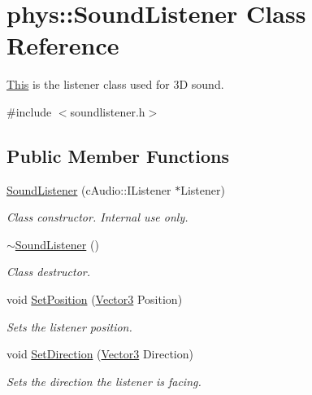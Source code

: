 \hypertarget{classphys_1_1SoundListener}{
\section{phys::SoundListener Class Reference}
\label{d1/d5a/classphys_1_1SoundListener}
}


\hyperlink{structThis}{This} is the listener class used for 3D sound.  




{\ttfamily \#include $<$soundlistener.h$>$}

\subsection*{Public Member Functions}
\begin{DoxyCompactItemize}
\item 
\hyperlink{classphys_1_1SoundListener_ab4063bdd8b0bc654a416915354ed0312}{SoundListener} (cAudio::IListener $\ast$Listener)
\begin{DoxyCompactList}\small\item\em Class constructor. Internal use only. \item\end{DoxyCompactList}\item 
\hyperlink{classphys_1_1SoundListener_ab32dd020228ca0e09271f988d3a2e7f9}{$\sim$SoundListener} ()
\begin{DoxyCompactList}\small\item\em Class destructor. \item\end{DoxyCompactList}\item 
void \hyperlink{classphys_1_1SoundListener_ab2a679aaf18c646365285c8691ffcb0c}{SetPosition} (\hyperlink{classphys_1_1Vector3}{Vector3} Position)
\begin{DoxyCompactList}\small\item\em Sets the listener position. \item\end{DoxyCompactList}\item 
void \hyperlink{classphys_1_1SoundListener_ad4ba93b650897e355c26b09e3f95bce0}{SetDirection} (\hyperlink{classphys_1_1Vector3}{Vector3} Direction)
\begin{DoxyCompactList}\small\item\em Sets the direction the listener is facing. \item\end{DoxyCompactList}\item 

\end{DoxyCompactItemize}
